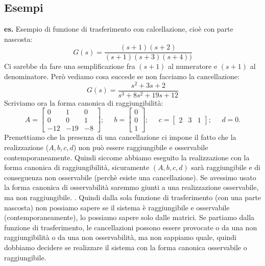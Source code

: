 \subsection{Esempi}
\textbf{es.} Esempio di funzione di trasferimento con calcellazione, cioè con parte nascosta:
\[
    G(s) = \frac{(s+1) (s+2)}{(s+1)(s+3)(s+4))}
\]
Ci sarebbe da fare una semplificazione fra $(s+1)$ al numeratore e $(s+1)$ al denominatore. Però vediamo cosa succede se non facciamo la cancellazione:
\[
    G(s) = \frac{s^2 + 3s + 2}{s^3+8s^2 +19 s + 12}
\]
Scriviamo ora la forma canonica di raggiungibilità:
\[
    A= \left[\begin{matrix}
        0 & 1 & 0\\
        0 & 0 & 1\\
        -12 & -19 & -8
    \end{matrix}\right]; \;\;\;\;\;b = \left[\begin{matrix}
        0 \\0\\1
    \end{matrix}\right]; \;\;\;\;\; c=\left[\begin{matrix}
        2&3&1
    \end{matrix}\right]; \;\;\;\;\;d=0.
\]
Premettiamo che la presenza di una cancellazione ci impone il fatto che la realizzazione ($A,b,c,d$) non può essere raggiungibile e osservabile contemporaneamente. Quindi siccome abbiamo eseguito la realizzazione con la forma canonica di raggiungibilità, sicuramente $(A,b,c,d)$ sarà raggiungibile e di conseguenza non osservabile (perchè esiste una cancellazione). Se avessimo usato la forma canonica di osservabilità saremmo giunti a una realizzazione osservabile, ma non raggiungibile.\newline
{}.\newline
\newline
Quindi dalla sola funzione di trasferimento (con una parte nascosta) non possiamo sapere se il sistema è raggiungibile e osservabile (contemporaneamente), lo possiamo sapere solo dalle matrici. Se partiamo dalla funzione di trasferimento, le cancellazioni possono essere provocate o da una non raggiungibilità o da una non osservabilità, ma non sappiamo quale, quindi dobbiamo decidere se realizzare il sistema con la forma canonica osservabile o raggiungibile.
\newpage
